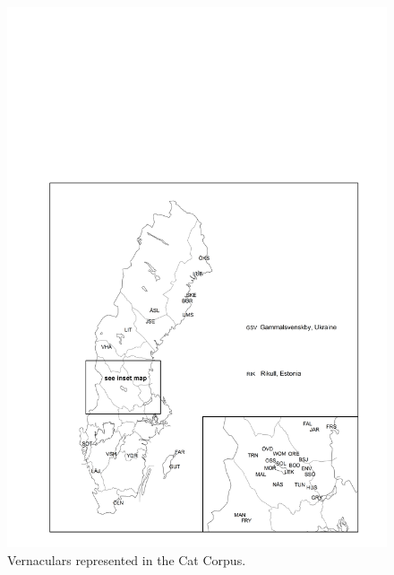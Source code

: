 \begin{figure}[h]

\includegraphics[height=.3\textheight]{figures/4_VernacularsrepresentedCatCorpus}
\caption{Vernaculars represented in the Cat Corpus.}
\label{map:3}

\end{figure}

